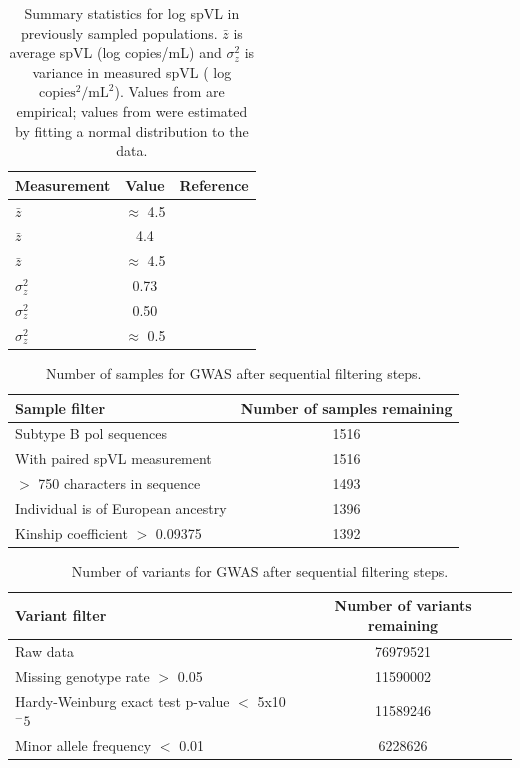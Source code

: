 \documentclass[]{article}
\begin{document}
\begin{table}[H]
\caption{Summary statistics for log spVL in previously sampled populations. $\bar{z}$ is average spVL (log copies/mL) and $\sigma^2_z$ is variance in measured spVL ( log $\textrm{copies}^2/\textrm{mL}^2$). Values from \protect\citep{Blanquart2017, Mitov2018} are empirical; values from \protect\citep{Bonhoeffer2015} were estimated by fitting a normal distribution to the data.}
	\begin{tabular}{lcc} \hline 
	Measurement & Value & Reference \\ \hline 
	$\bar{z}$ & $\approx$ 4.5 & \citet{Mitov2018} \\
	$\bar{z}$ &  4.4 & \citet{Blanquart2017} \\
	$\bar{z}$ & $\approx$ 4.5 & \citet{Bonhoeffer2015} \\
	$\sigma^2_z$ &  0.73 &  \citet{Mitov2018} \\
	$\sigma^2_z$ &  0.50 & \citet{Blanquart2017} \\
	$\sigma^2_z$ & $\approx$ 0.5 & \citet{Bonhoeffer2015} \\ \hline 
	\end{tabular}
	\label{tab:spVLmeasurements}
\end{table}

\begin{table}[H]
\caption{Number of samples for GWAS after sequential filtering steps.}
    \begin{tabular}{lc}
    \hline
    Sample filter & Number of samples remaining \\
    \hline
    Subtype B pol sequences & 1516 \\
    With paired spVL measurement & 1516 \\
    $>$ 750 characters in sequence & 1493 \\
    Individual is of European ancestry & 1396 \\
    Kinship coefficient $>$ 0.09375 & 1392 \\ 
    \hline
    \end{tabular}
    \label{tab:sample-filtering}
\end{table}

\begin{table}[H]
\caption{Number of variants for GWAS after sequential filtering steps.}
	\begin{tabular}{lc}
	\hline
	Variant filter & Number of variants remaining \\
	\hline 
	Raw data & 76979521 \\
	Missing genotype rate $>$ 0.05 & 11590002 \\
	Hardy-Weinburg exact test p-value $<$ 5x10$^-5$ & 11589246 \\
	Minor allele frequency $<$ 0.01 & 6228626 \\ \hline			
	\end{tabular}
	\label{tab:variant-filtering}
\end{table}
\end{document}

